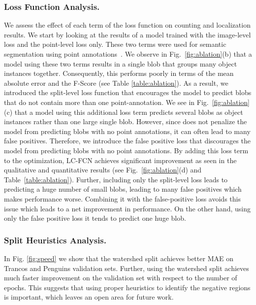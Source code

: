 \documentclass[runningheads]{llncs}
\begin{document}
\subsubsection{Loss Function Analysis.}
We assess the effect of each term of the loss function on counting and localization results. We start by looking at the results of a model trained with the image-level loss  and the point-level loss  only. These two terms were used for semantic segmentation using point annotations~\cite{bearman2016s}. We observe in Fig.~\ref{fig:ablation}(b) that a model using these two terms results in a single blob that groups many object instances together. Consequently, this performs poorly in terms of the mean absolute error and the F-Score (see Table \ref{table:ablation}).  As a result, we introduced the split-level loss function  that encourages the model to predict blobs that do not contain more than one point-annotation. We see in Fig.~\ref{fig:ablation}(c) that a model using this additional loss term predicts several blobs as object instances rather than one large single blob. However,  since  does not penalize the model from predicting blobs with no point annotations, it can often lead to many false positives. Therefore, we introduce the false positive loss  that discourages the model from predicting blobs with no point annotations. By adding this loss term to the optimization, LC-FCN achieves significant improvement as seen in the qualitative and quantitative results (see Fig.~\ref{fig:ablation}(d) and Table~\ref{table:ablation}). Further, including only the split-level loss leads to predicting a huge number of small blobs, leading to many false positives which makes performance worse. Combining it with the false-positive loss avoids this issue which leads to a net improvement in performance. On the other hand, using only the false positive loss it tends to predict one huge blob.

\subsubsection{Split Heuristics Analysis.}
In Fig. \ref{fig:speed}  we show that the watershed split achieves better MAE on Trancos and Penguins validation sets. Further, using the watershed split achieves much faster improvement on the validation set with respect to the number of epochs. This suggests that using proper heuristics to identify the negative regions is important, which leaves an open area for future work.
\end{document}
